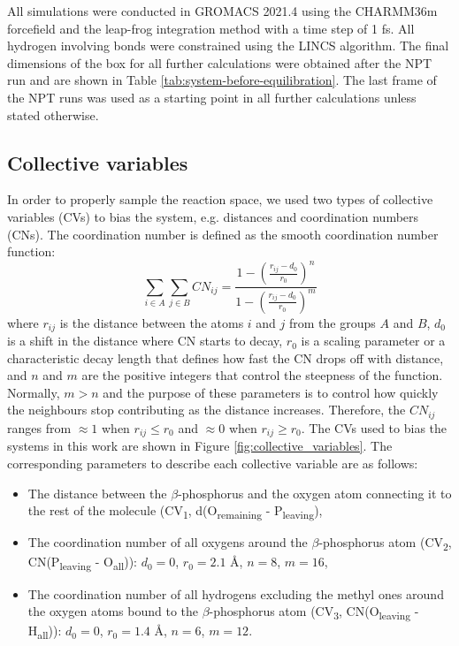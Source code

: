 All simulations were conducted in GROMACS 2021.4 \citep{abrahamGROMACSHighPerformance2015} using the CHARMM36m forcefield \citep{huangCHARMM36mImprovedForce2017} and the leap-frog integration method with a time step of 1 fs. All hydrogen involving bonds were constrained using the LINCS algorithm. The final dimensions of the box for all further calculations were obtained after the NPT run and are shown in Table \ref{tab:system-before-equilibration}. The last frame of the NPT runs was used as a starting point in all further calculations unless stated otherwise.



\subsection{Collective variables}
In order to properly sample the reaction space, we used two types of collective variables (CVs) to bias the system, e.g. distances and coordination numbers (CNs). The coordination number is defined as the smooth coordination number function:
\begin{equation}
    \sum_{i \in A} \sum_{j \in B} CN_{ij} = \frac{1 - \left( \frac{r_{ij} - d_0}{r_0} \right)^n}{1 - \left( \frac{r_{ij} - d_0}{r_0} \right)^m}
    \label{eq:coordination_number}
\end{equation}
where $r_{ij}$ is the distance between the atoms $i$ and $j$ from the groups $A$ and $B$, $d_0$ is a shift in the distance where CN starts to decay, $r_0$ is a scaling parameter or a characteristic decay length that defines how fast the CN drops off with distance, and $n$ and $m$ are the positive integers that control the steepness of the function. Normally, $m > n$ and the purpose of these parameters is to control how quickly the neighbours stop contributing as the distance increases. Therefore, the $CN_{ij}$ ranges from $\approx1$ when $r_{ij} \le r_0$ and $\approx0$ when $r_{ij} \ge r_0$. The CVs used to bias the systems in this work are shown in Figure \ref{fig:collective_variables}. The corresponding parameters to describe each collective variable are as follows:

\begin{itemize}
    \item The distance between the $\beta$-phosphorus and the oxygen atom connecting it to the rest of the molecule (CV\textsubscript{1}, d(O\textsubscript{remaining} - P\textsubscript{leaving}),
    \item The coordination number of all oxygens around the $\beta$-phosphorus atom (CV\textsubscript{2}, CN(P\textsubscript{leaving} - O\textsubscript{all})): $d_0 = 0$, $r_0 = 2.1$ \AA, $n = 8$, $m = 16$,
    \item The coordination number of all hydrogens excluding the methyl ones around the oxygen atoms bound to the $\beta$-phosphorus atom (CV\textsubscript{3}, CN(O\textsubscript{leaving} - H\textsubscript{all})): $d_0 = 0$, $r_0 = 1.4$ \AA, $n = 6$, $m = 12$.
\end{itemize}

